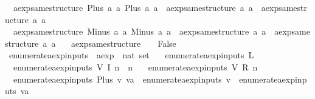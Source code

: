 \begin{isabellebody}
\ \ {\isachardoublequoteopen}aexp{\isacharunderscore}same{\isacharunderscore}structure\ {\isacharparenleft}Plus\ a{}\ a{}{\isacharparenright}\ {\isacharparenleft}Plus\ a{}{\isacharprime}\ a{}{\isacharprime}{\isacharparenright}\ {\isacharequal}\ {\isacharparenleft}aexp{\isacharunderscore}same{\isacharunderscore}structure\ a{}\ a{}{\isacharprime}\ {\isasymand}\ aexp{\isacharunderscore}same{\isacharunderscore}structure\ a{}\ a{}{\isacharprime}{\isacharparenright}{\isachardoublequoteclose}\ {\isacharbar}\isanewline
\ \ {\isachardoublequoteopen}aexp{\isacharunderscore}same{\isacharunderscore}structure\ {\isacharparenleft}Minus\ a{}\ a{}{\isacharparenright}\ {\isacharparenleft}Minus\ a{}{\isacharprime}\ a{}{\isacharprime}{\isacharparenright}\ {\isacharequal}\ {\isacharparenleft}aexp{\isacharunderscore}same{\isacharunderscore}structure\ a{}\ a{}{\isacharprime}\ {\isasymand}\ aexp{\isacharunderscore}same{\isacharunderscore}structure\ a{}\ a{}{\isacharprime}{\isacharparenright}{\isachardoublequoteclose}\ {\isacharbar}\isanewline
\ \ {\isachardoublequoteopen}aexp{\isacharunderscore}same{\isacharunderscore}structure\ {\isacharunderscore}\ {\isacharunderscore}\ {\isacharequal}\ False{\isachardoublequoteclose}\isanewline
\isanewline
{}\isamarkupfalse%
\ enumerate{\isacharunderscore}aexp{\isacharunderscore}inputs\ {\isacharcolon}{\isacharcolon}\ {\isachardoublequoteopen}aexp\ {\isasymRightarrow}\ nat\ set{\isachardoublequoteclose}\ \isanewline
\ \ {\isachardoublequoteopen}enumerate{\isacharunderscore}aexp{\isacharunderscore}inputs\ {\isacharparenleft}L\ {\isacharunderscore}{\isacharparenright}\ {\isacharequal}\ {\isacharbraceleft}{\isacharbraceright}{\isachardoublequoteclose}\ {\isacharbar}\isanewline
\ \ {\isachardoublequoteopen}enumerate{\isacharunderscore}aexp{\isacharunderscore}inputs\ {\isacharparenleft}V\ {\isacharparenleft}I\ n{\isacharparenright}{\isacharparenright}\ {\isacharequal}\ {\isacharbraceleft}n{\isacharbraceright}{\isachardoublequoteclose}\ {\isacharbar}\isanewline
\ \ {\isachardoublequoteopen}enumerate{\isacharunderscore}aexp{\isacharunderscore}inputs\ {\isacharparenleft}V\ {\isacharparenleft}R\ n{\isacharparenright}{\isacharparenright}\ {\isacharequal}\ {\isacharbraceleft}{\isacharbraceright}{\isachardoublequoteclose}\ {\isacharbar}\isanewline
\ \ {\isachardoublequoteopen}enumerate{\isacharunderscore}aexp{\isacharunderscore}inputs\ {\isacharparenleft}Plus\ v\ va{\isacharparenright}\ {\isacharequal}\ enumerate{\isacharunderscore}aexp{\isacharunderscore}inputs\ v\ {\isasymunion}\ enumerate{\isacharunderscore}aexp{\isacharunderscore}inputs\ va{\isachardoublequoteclose}\ {\isacharbar}\isanewline

\end{isabellebody}
